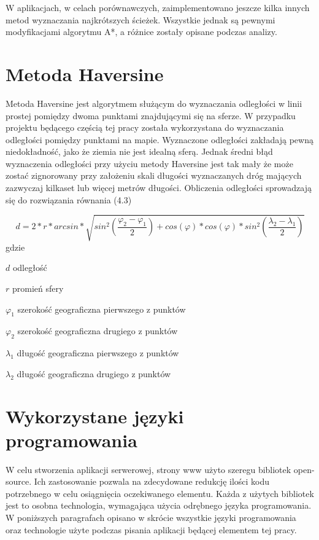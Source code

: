 W aplikacjach, w celach porównawczych, zaimplementowano jeszcze kilka innych metod wyznaczania najkrótszych ścieżek. Wszystkie jednak są pewnymi modyfikacjami algorytmu A*, a różnice zostały opisane podczas analizy.

\section{Metoda Haversine}

Metoda Haversine jest algorytmem służącym do wyznaczania odległości w linii prostej pomiędzy dwoma punktami znajdującymi się na sferze. W przypadku projektu będącego częścią tej pracy została wykorzystana do wyznaczania odległości pomiędzy punktami na mapie. Wyznaczone odległości zakładają pewną niedokładność, jako że ziemia nie jest idealną sferą. Jednak średni błąd wyznaczenia odległości przy użyciu metody Haversine jest tak mały że może zostać zignorowany przy założeniu skali długości wyznaczanych dróg mających zazwyczaj kilkaset lub więcej metrów długości.\newline
Obliczenia odległości sprowadzają się do rozwiązania równania (4.3)

\begin{equation}
d=2*r*arcsin*\sqrt{sin^2(\frac{\varphi_{2}-\varphi_{1}}{2}) + cos(\varphi)*cos(\varphi)*sin^2(\frac{\lambda_{2}-\lambda_{1}}{2})}
\end{equation}
gdzie
\begin{eqwhere}[2cm]
	\item[$d$] odległość
	\item[$r$] promień sfery
	\item[$\varphi_{1}$] szerokość geograficzna pierwszego z punktów 
	\item[$\varphi_{2}$]  szerokość geograficzna drugiego z punktów 
	\item[$\lambda_{1}$] długość geograficzna pierwszego z punktów 
	\item[$\lambda_{2}$] długość geograficzna drugiego z punktów
\end{eqwhere}

\section{Wykorzystane języki programowania}

W celu stworzenia aplikacji serwerowej, strony www użyto szeregu bibliotek open-source. Ich zastosowanie pozwala na zdecydowane redukcję ilości kodu potrzebnego w celu osiągnięcia oczekiwanego elementu. Każda z użytych bibliotek jest to osobna technologia, wymagająca użycia odrębnego języka programowania. W poniższych paragrafach opisano w skrócie wszystkie języki programowania oraz technologie użyte podczas pisania aplikacji będącej elementem tej pracy.

